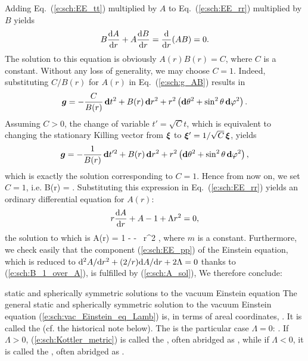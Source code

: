 Adding Eq.~(\ref{e:sch:EE_tt}) multiplied by $A$ to
Eq.~(\ref{e:sch:EE_rr}) multiplied by $B$ yields
\[
    B \frac{\mathrm{d} A}{\mathrm{d} r} + A \frac{\mathrm{d} B}{\mathrm{d} r} = \frac{\mathrm{d} }{\mathrm{d} r}(AB) = 0 .
\]
The solution to this equation is obviously $A(r)B(r) = C$, where $C$ is a constant.
Without any loss of generality, we may choose $C=1$. Indeed, substituting
$C/B(r)$ for $A(r)$ in Eq.~(\ref{e:sch:g_AB}) results in
\[
    \bm{g} = -\frac{C}{B(r)}\, \mathbf{d} t^2 + B(r)\, \mathbf{d} r^2 +
        r^2 \left( \mathbf{d}\theta^2 + \sin^2\theta\, \mathbf{d}\varphi^2 \right) .
\]
Assuming $C>0$, the change of variable $t' = \sqrt{C} t$, which is equivalent
to changing the stationary Killing vector from $\bm{\xi}$ to
$\bm{\xi}'=  1/\sqrt{C}\, \bm{\xi}$,
yields
\[
    \bm{g} = -\frac{1}{B(r)}\, \mathbf{d} t'^2 + B(r)\, \mathbf{d} r^2 +
        r^2 \left( \mathbf{d}\theta^2 + \sin^2\theta\, \mathbf{d}\varphi^2 \right) ,
\]
which is exactly the solution corresponding to $C=1$. Hence from now on,
we set $C=1$, i.e.
\be \label{e:sch:B_1_over_A}
    B(r) =  .
\ee
Substituting this expression in Eq.~(\ref{e:sch:EE_rr}) yields an ordinary
differential equation for $A(r)$:
\[
    r \frac{\mathrm{d} A}{\mathrm{d} r} + A - 1 + \Lambda r^2 = 0 ,
\]
the solution to which is
\be \label{e:sch:A_sol}
    A(r) = 1 -  -  \,  r^2 ,
\ee
where $m$ is a constant.
Furthermore, we check easily that the component
(\ref{e:sch:EE_pp}) of the Einstein equation, which is reduced to
$\mathrm{d}^2 A / \mathrm{d} r^2 + (2/r) \mathrm{d} A / \mathrm{d} r + 2\Lambda = 0$ thanks to (\ref{e:sch:B_1_over_A}),
is fulfilled by (\ref{e:sch:A_sol}),
We therefore conclude:
\begin{tprop}{static and spherically symmetric solutions to the vacuum Einstein equation}{}
The general static and spherically symmetric solution to the vacuum
Einstein equation (\ref{e:sch:vac_Einstein_eq_Lamb}) is, in terms of areal coordinates,
\be \label{e:sch:Kottler_metric}
    .
\ee
It is called the  (cf. the historical
note below).
The   is the
particular case $\Lambda=0$:
\be \label{e:sch:Schwarz_metric_SD}
    .
\ee
If $\Lambda>0$,
(\ref{e:sch:Kottler_metric}) is called the
,
often abridged as , while if $\Lambda<0$, it
is called the ,
often abridged as .
\end{tprop}

